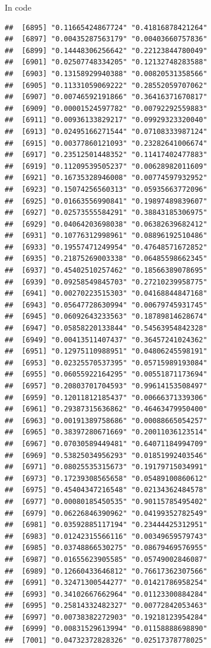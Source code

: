 \documentclass[ignorenonframetext,]{beamer}
\begin{document}
\begin{frame}[fragile]{In code}
\begin{verbatim}
##  [6895] "0.11665424867724" "0.41816878421264"
##  [6897] "0.00435287563179" "0.00403660757836"
##  [6899] "0.14448306256642" "0.22123844780049"
##  [6901] "0.02507748334205" "0.12132748283588"
##  [6903] "0.13158929940388" "0.00820531358566"
##  [6905] "0.11331059069222" "0.28552059707062"
##  [6907] "0.00746592191866" "0.36416371670817"
##  [6909] "0.00001524597782" "0.00792292559883"
##  [6911] "0.00936133829217" "0.09929323320040"
##  [6913] "0.02495166271544" "0.07108333987124"
##  [6915] "0.00377860121093" "0.23282641006674"
##  [6917] "0.23512501448352" "0.11417402477883"
##  [6919] "0.11209539505237" "0.00628982011609"
##  [6921] "0.16735328946008" "0.00774597932952"
##  [6923] "0.15074256560313" "0.05935663772096"
##  [6925] "0.01663556990841" "0.19897489839607"
##  [6927] "0.02573555584291" "0.38843185306975"
##  [6929] "0.04064203698038" "0.06382639682412"
##  [6931] "0.10776312998961" "0.08896192510486"
##  [6933] "0.19557471249954" "0.47648571672852"
##  [6935] "0.21875269003338" "0.06485598662345"
##  [6937] "0.45402510257462" "0.18566389078695"
##  [6939] "0.09258549845703" "0.27210239958775"
##  [6941] "0.00270223515303" "0.04168844847168"
##  [6943] "0.05647728630994" "0.00679745931745"
##  [6945] "0.06092643233563" "0.18789814628674"
##  [6947] "0.05858220133844" "0.54563954842328"
##  [6949] "0.00413511407437" "0.36457241024362"
##  [6951] "0.12975110988951" "0.04806245598191"
##  [6953] "0.02325570537395" "0.05715989193084"
##  [6955] "0.06055922164295" "0.00551871173694"
##  [6957] "0.20803701704593" "0.99614153508497"
##  [6959] "0.12011812185437" "0.00666371339306"
##  [6961] "0.29387315636862" "0.46463479950400"
##  [6963] "0.00191389758686" "0.00088665054257"
##  [6965] "0.38397280671669" "0.20011036123514"
##  [6967] "0.07030589449481" "0.64071184994709"
##  [6969] "0.53825034956293" "0.01851992403546"
##  [6971] "0.08025535315673" "0.19179715034991"
##  [6973] "0.17239308565658" "0.05489100860612"
##  [6975] "0.45404347216548" "0.02134362484578"
##  [6977] "0.00080185450535" "0.90115785495402"
##  [6979] "0.06226846390962" "0.04199352782549"
##  [6981] "0.03592885117194" "0.23444425312951"
##  [6983] "0.01242315566116" "0.00349659579743"
##  [6985] "0.03748866530275" "0.08679469576955"
##  [6987] "0.01655623905585" "0.05749002846087"
##  [6989] "0.12660433646812" "0.76617362307566"
##  [6991] "0.32471300544277" "0.01421786958254"
##  [6993] "0.34102667662964" "0.01123300884284"
##  [6995] "0.25814332482327" "0.00772842053463"
##  [6997] "0.00738382272903" "0.19218123954284"
##  [6999] "0.00831529613994" "0.01158888698890"
##  [7001] "0.04732372828326" "0.02517378778025"

\end{verbatim}
\end{frame}
\end{document}
